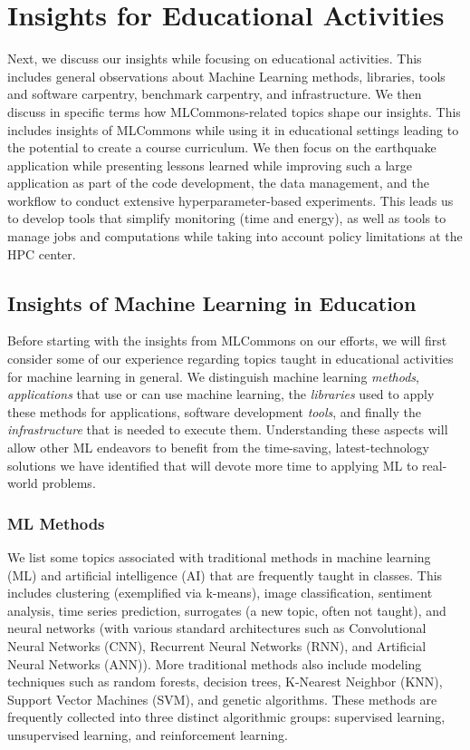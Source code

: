 \documentclass[utf8]{FrontiersinVancouver} %
\begin{document}
\section{Insights for Educational Activities}

Next, we discuss our insights while focusing on educational activities. This includes general observations about Machine Learning methods, libraries, tools and software carpentry, benchmark carpentry, and infrastructure. We then discuss in specific terms how MLCommons-related topics shape our insights. This includes insights of MLCommons while using it in educational settings leading to the potential to create a course curriculum. We then focus on the earthquake application while presenting lessons learned while improving such a large application as part of the code development, the data management, and the workflow to conduct extensive hyperparameter-based experiments. This leads us to develop tools that simplify monitoring (time and energy), as well as tools to manage jobs and computations while taking into account policy limitations at the HPC center.

\subsection{Insights of Machine Learning in Education}
\label{sec:edu-ml}

Before starting with the insights from MLCommons on our efforts, we will first consider some of our experience regarding topics taught in educational activities for machine learning in general. We distinguish machine learning {\em methods}, {\em applications} that use or can use machine learning, the {\em libraries} used to apply these methods for applications, software development {\em tools}, and finally the {\em
infrastructure} that is needed to execute them. Understanding these aspects will allow other ML endeavors to benefit from the time-saving, latest-technology solutions we have identified that will devote more time to applying ML to real-world problems.


\subsubsection{ML Methods}

We list some topics associated with traditional methods in machine learning (ML) and artificial intelligence (AI) that are frequently taught in classes. This includes clustering (exemplified via k-means), image classification, sentiment analysis, time series prediction, surrogates (a new topic, often not taught), and neural networks (with various standard architectures such as Convolutional Neural Networks (CNN), Recurrent Neural Networks (RNN), and Artificial Neural Networks (ANN)). More traditional methods also include modeling techniques such as random forests, decision trees, K-Nearest Neighbor (KNN), Support Vector Machines (SVM), and genetic algorithms. These methods are frequently collected into three distinct algorithmic groups: supervised learning, unsupervised learning, and reinforcement learning.
\end{document}
